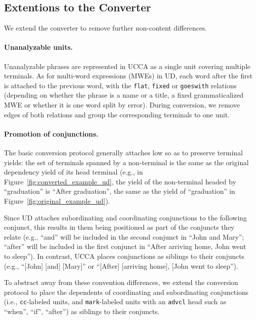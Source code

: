 \documentclass[11pt,a4paper]{article}
\begin{document}
\subsection{Extentions to the Converter}\label{sec:local}

We extend the converter to remove further non-content differences.

\paragraph{Unanalyzable units.}
Unanalyzable phrases are represented in UCCA as a single unit covering multiple terminals.
As for multi-word expressions (MWEs) in UD, each word after the first is attached to the previous word,
with the \texttt{flat}, \texttt{fixed} or \texttt{goeswith} relations
(depending on whether the phrase is a name or a title, a fixed grammaticalized MWE
or whether it is one word split by error).
During conversion, we remove edges of both relations and group the corresponding terminals to one unit.

\paragraph{Promotion of conjunctions.}
The basic conversion protocol generally attaches low so as to preserve terminal yields:
the set of terminals spanned by a non-terminal is the same
as the original dependency yield of its head terminal
(e.g., in Figure~\ref{fig:converted_example_ud}, the yield of the non-terminal
headed by ``graduation'' is ``After graduation'', the same as the yield of ``graduation''
in Figure~\ref{fig:original_example_ud}).

Since UD attaches subordinating and coordinating conjunctions to the following conjunct,
this results in them being positioned as part
of the conjuncts they relate (e.g., ``and'' will be included in the second conjunct in ``John and Mary''; 
``after'' will be included in the first conjunct in ``After arriving home, John went to sleep'').
In contrast, UCCA places conjunctions as siblings to their conjuncts (e.g., ``[John] [and] [Mary]'' or
``[After] [arriving home], [John went to sleep''). 

To abstract away from these convention differences,
we extend the conversion protocol to place 
the dependents of coordinating and subordinating conjunctions 
(i.e., \texttt{cc}-labeled units, and \texttt{mark}-labeled units with an \texttt{advcl} head such 
as ``when'', ``if'', ``after'') as siblings to their conjuncts.
\end{document}
